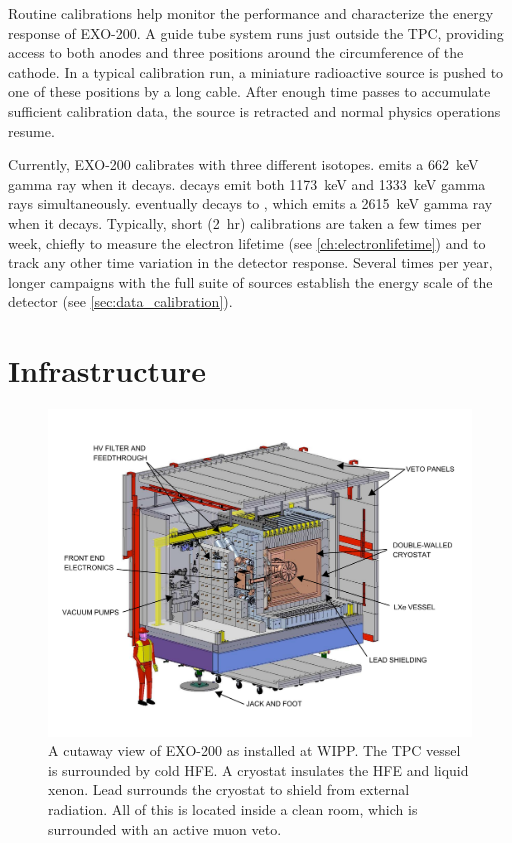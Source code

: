 \documentclass[herrin-thesis.tex]{subfiles}
\begin{document}
Routine calibrations help monitor the performance and characterize the energy response of EXO-200. A guide tube system runs just outside the TPC, providing access to both anodes and three positions around the circumference of the cathode. In a typical calibration run, a miniature radioactive source is pushed to one of these positions by a long cable. After enough time passes to accumulate sufficient calibration data, the source is retracted and normal physics operations resume.

Currently, EXO-200 calibrates with three different isotopes.  emits a \SI{662}{\keV} gamma ray when it decays.  decays emit both \SI{1173}{\keV} and \SI{1333}{\keV} gamma rays simultaneously.  eventually decays to , which emits a \SI{2615}{\keV} gamma ray when it decays. Typically, short (\SI{2}{hr})  calibrations are taken a few times per week, chiefly to measure the electron lifetime (see \cref{ch:electronlifetime}) and to track any other time variation in the detector response. Several times per year, longer campaigns with the full suite of sources establish the energy scale of the detector (see \cref{sec:data_calibration}).

\section{Infrastructure}

\begin{figure}
\centering
\includegraphics[width=1.0\textwidth]{./photos/detector_cleanroom.pdf}
\caption[Cutaway view of EXO-200 as installed]{A cutaway view of EXO-200 as installed at WIPP. The TPC vessel is surrounded by cold HFE. A cryostat insulates the HFE and liquid xenon. Lead surrounds the cryostat to shield from external radiation. All of this is located inside a clean room, which is surrounded with an active muon veto.}
\label{fig:detector_cleanroom}
\end{figure}
\end{document}
